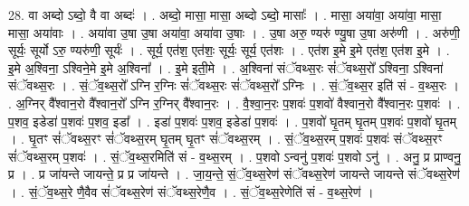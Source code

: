 \documentclass[17pt]{extarticle}
\begin{document}
28. वा अब्दो ऽब्दो॒ वै वा अब्दः॑ । . अब्दो॒ मासा॒ मासा॒ अब्दो ऽब्दो॒ मासाः᳚ । . मासा॒ अया॑वा॒ अया॑वा॒ मासा॒ मासा॒ अया॑वाः । . अया॑वा उ॒षा उ॒षा अया॑वा॒ अया॑वा उ॒षाः । . उ॒षा अरु॒ ण्यरु॑ ण्यु॒षा उ॒षा अरु॑णी । . अरु॑णी॒ सूर्यः॒ सूर्यो ऽरु॒ ण्यरु॑णी॒ सूर्यः॑ । . सूर्य॒ एत॑श॒ एत॑शः॒ सूर्यः॒ सूर्य॒ एत॑शः । . एत॑श इ॒मे इ॒मे एत॑श॒ एत॑श इ॒मे । . इ॒मे अ॒श्विना॒ ऽश्विने॒मे इ॒मे अ॒श्विना᳚ । . इ॒मे इती॒मे । . अ॒श्विना॑ संॅवथ्स॒रः सं॑ॅवथ्स॒रो᳚ ऽश्विना॒ ऽश्विना॑ संॅवथ्स॒रः । . सं॒ॅव॒थ्स॒रो᳚ ऽग्नि र॒ग्निः सं॑ॅवथ्स॒रः सं॑ॅवथ्स॒रो᳚ ऽग्निः । . सं॒ॅव॒थ्स॒र इति॑ सं - व॒थ्स॒रः । . अ॒ग्निर् वै᳚श्वान॒रो वै᳚श्वान॒रो᳚ ऽग्नि र॒ग्निर् वै᳚श्वान॒रः । . वै॒श्वा॒न॒रः प॒शवः॑ प॒शवो॑ वैश्वान॒रो वै᳚श्वान॒रः प॒शवः॑ । . प॒शव॒ इडेडा॑ प॒शवः॑ प॒शव॒ इडा᳚ । . इडा॑ प॒शवः॑ प॒शव॒ इडेडा॑ प॒शवः॑ । . प॒शवो॑ घृ॒तम् घृ॒तम् प॒शवः॑ प॒शवो॑ घृ॒तम् । . घृ॒तꣳ सं॑ॅवथ्स॒रꣳ सं॑ॅवथ्स॒रम् घृ॒तम् घृ॒तꣳ सं॑ॅवथ्स॒रम् । . सं॒ॅव॒थ्स॒रम् प॒शवः॑ प॒शवः॑ संॅवथ्स॒रꣳ सं॑ॅवथ्स॒रम् प॒शवः॑ । . सं॒ॅव॒थ्स॒रमिति॑ सं - व॒थ्स॒रम् । . प॒शवो ऽन्वनु॑ प॒शवः॑ प॒शवो ऽनु॑ । . अनु॒ प्र प्राण्वनु॒ प्र । . प्र जा॑यन्ते जायन्ते॒ प्र प्र जा॑यन्ते । . जा॒य॒न्ते॒ सं॒ॅव॒थ्स॒रेण॑ संॅवथ्स॒रेण॑ जायन्ते जायन्ते संॅवथ्स॒रेण॑ । . सं॒ॅव॒थ्स॒रे णै॒वैव सं॑ॅवथ्स॒रेण॑ संॅवथ्स॒रेणै॒व । . सं॒ॅव॒थ्स॒रेणेति॑ सं - व॒थ्स॒रेण॑ । \newline
\end{document}
